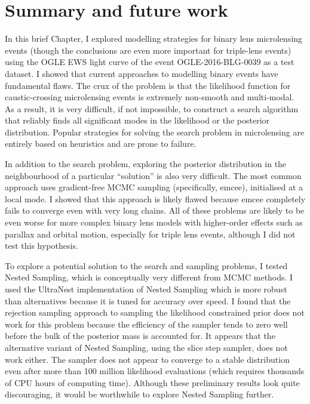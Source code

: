 \documentclass[12pt,dvipsnames]{report}
\newcommand{\ssf}[1]{\textsf{#1}}
\begin{document}
\section{Summary and future work}
In this brief Chapter, I explored modelling strategies for binary lens microlensing events
(though the conclusions are even more important for triple-lens events)
using the OGLE EWS light curve of the event OGLE-2016-BLG-0039 as a test dataset. 
I showed that current approaches to modelling binary events have fundamental flaws. 
The crux of the problem is that the likelihood function for caustic-crossing microlensing 
events is extremely non-smooth and multi-modal. As a result, 
it is very difficult, if not impossible, to construct a search algorithm that reliably 
finds all significant modes in the likelihood or the posterior distribution. 
Popular strategies for solving the search problem in microlensing are entirely based on heuristics 
and are prone to failure. 

In addition to the search problem, exploring the 
posterior distribution in the neighbourhood of a particular ``solution'' is also very difficult.
The most common approach uses  gradient-free MCMC sampling (specifically, \ssf{emcee}),
initialised at a local mode.
I showed that this approach is likely flawed because \ssf{emcee} completely fails to converge even 
with very long chains. 
All of these problems are likely to be even worse for more complex binary lens models 
with higher-order effects such as parallax and orbital motion, especially for triple 
lens events, although I did not test this hypothesis.

To explore a potential solution to the search and sampling problems, I tested Nested Sampling,
which is conceptually very different from MCMC methods.
I used the \ssf{UltraNest} implementation of Nested Sampling which 
is more robust than alternatives because it is tuned for accuracy over speed.
I found that the rejection sampling approach to sampling the likelihood constrained prior 
does not work for this problem because the efficiency of the sampler tends to zero well 
before the bulk of the posterior mass is accounted for.
It appears that the alternative variant of Nested Sampling, using the slice step sampler,
does not work either.
The sampler does not appear to converge to a stable distribution even
after more than 100 million likelihood evaluations (which requires thousands of CPU 
hours of computing time). Although these preliminary results look quite discouraging,
it would be worthwhile to explore Nested Sampling further. 
\end{document}

